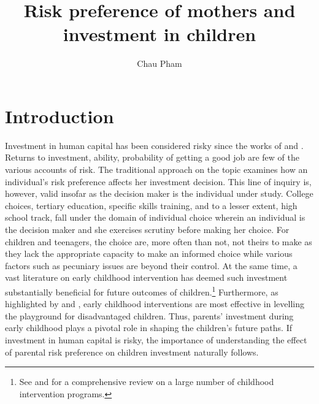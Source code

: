 \documentclass[]{article}
\title{Risk preference of mothers and investment in children}
\author{Chau Pham}
\begin{document}
\maketitle
\onehalfspacing



\section{Introduction}
Investment in human capital has been considered risky since the works of \citet{becker1962investment, levhari1974effect} and \citet{schultz1971investment}. Returns to investment, ability, probability of getting a good job are few of the various accounts of risk. The traditional approach on the topic examines how an individual's risk preference affects her investment decision. This line of inquiry is, however, valid insofar as the decision maker is the individual under study. College choices, tertiary education, specific skills training, and to a lesser extent, high school track, fall under the domain of individual choice wherein an individual is the decision maker and she exercises scrutiny before making her choice. For children and teenagers, the choice are, more often than not, not theirs to make as they lack the appropriate capacity to make an informed choice while various factors such as pecuniary issues are beyond their control. At the same  time, a vast literature on early childhood intervention has deemed such investment substantially beneficial for future outcomes of children.\footnote{See \citet{Currie2001} and \citet{NORES2010} for a comprehensive review on a large number of childhood intervention programs.} Furthermore, as highlighted by \citet{jacob2008improving} and \citet{duflo2011poor}, early childhood interventions are most effective in levelling the playground for disadvantaged children. Thus, parents' investment during early childhood plays a pivotal role in shaping the children's future paths. If investment in human capital is risky, the importance of understanding the effect of parental risk preference on children investment naturally follows.
\end{document}
